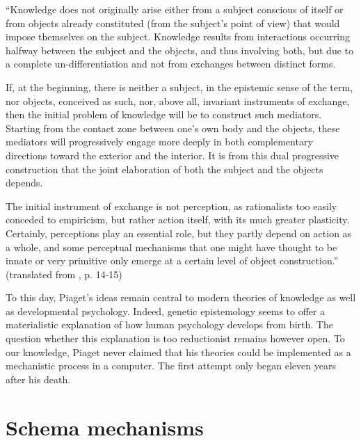 \documentclass[runningheads]{llncs}
\begin{document}
\begin{adjustwidth}{1cm}{1cm}
``Knowledge does not originally arise either from a subject conscious of itself or from objects already constituted (from the subject's point of view) that would impose themselves on the subject. 
Knowledge results from interactions occurring halfway between the subject and the objects, and thus involving both, but due to a complete un-differentiation and not from exchanges between distinct forms.

If, at the beginning, there is neither a subject, in the epistemic sense of the term, nor objects, conceived as such, nor, above all, invariant instruments of exchange, then the initial problem of knowledge will be to construct such mediators. 
Starting from the contact zone between one's own body and the objects, these mediators will progressively engage more deeply in both complementary directions toward the exterior and the interior. 
It is from this dual progressive construction that the joint elaboration of both the subject and the objects depends.

The initial instrument of exchange is not perception, as rationalists too easily conceded to empiricism, but rather action itself, with its much greater plasticity. 
Certainly, perceptions play an essential role, but they partly depend on action as a whole, and some perceptual mechanisms that one might have thought to be innate or very primitive only emerge at a certain level of object construction.'' (translated from \cite{piaget_lepistemologie_2011}, p. 14-15)
\\

\end{adjustwidth}

To this day, Piaget's ideas remain central to modern theories of knowledge as well as developmental psychology. 
Indeed, genetic epistemology seems to offer a materialistic explanation of how human psychology develops from birth.
The question whether this explanation is too reductionist remains however open. 
To our knowledge, Piaget never claimed that his theories could be implemented as a mechanistic process in a computer. 
The first attempt only began eleven years after his death.

\cite{chaput_constructivist_2004}
\cite{guerin_piagetian_2008}
\cite{miller_building_2018}


\section{Schema mechanisms}
\label{sec:schema}
\end{document}
